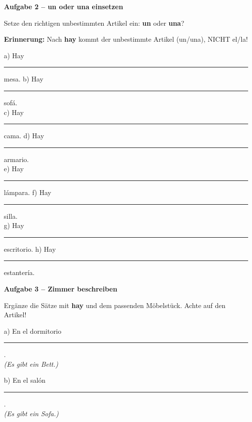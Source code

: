 \documentclass[11pt, a4paper]{article}
\newcommand{\fachfarbe}{spanisch}
\newcommand{\punktebox}[1]{\hfill\fbox{\small \_/#1}}
\newcommand{\luecke}[1]{\rule{#1}{0.4pt}}
\newenvironment{aufgabe}[1]{%
    \needspace{5\baselineskip}%
    \nopagebreak[4]%
    \vspace{10pt}
    \noindent\textbf{\textcolor{\fachfarbe}{Aufgabe #1}}
    \nopagebreak[4]%
    \vspace{5pt}
    \nopagebreak[4]%
    \begin{list}{}{\leftmargin=0pt}
    \item[]
}{%
    \end{list}
}
\newcommand{\es}[1]{\textcolor{\fachfarbe}{\textbf{#1}}}
\begin{document}
\vspace{15pt}


\begin{aufgabe}{2 -- un oder una einsetzen}
Setze den richtigen unbestimmten Artikel ein: \es{un} oder \es{una}? \punktebox{8}
\end{aufgabe}

\begin{warnbox}
\textbf{Erinnerung:} Nach \es{hay} kommt der unbestimmte Artikel (un/una), NICHT el/la!
\end{warnbox}

\vspace{0.5em}

\noindent
a) Hay \luecke{1.5cm} mesa. \hfill
b) Hay \luecke{1.5cm} sofá. \\[0.8em]
c) Hay \luecke{1.5cm} cama. \hfill
d) Hay \luecke{1.5cm} armario. \\[0.8em]
e) Hay \luecke{1.5cm} lámpara. \hfill
f) Hay \luecke{1.5cm} silla. \\[0.8em]
g) Hay \luecke{1.5cm} escritorio. \hfill
h) Hay \luecke{1.5cm} estantería. \\

\vspace{15pt}


\begin{aufgabe}{3 -- Zimmer beschreiben}
Ergänze die Sätze mit \es{hay} und dem passenden Möbelstück. Achte auf den Artikel! \punktebox{12}
\end{aufgabe}

\noindent
a) En el dormitorio \luecke{5cm}. \\
\hspace*{0.5cm}\textit{(Es gibt ein Bett.)}

\vspace{0.8em}

\noindent
b) En el salón \luecke{5cm}. \\
\hspace*{0.5cm}\textit{(Es gibt ein Sofa.)}

\vspace{0.8em}
\end{document}
